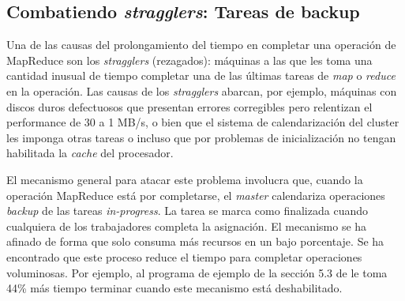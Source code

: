 \documentclass[spanish]{article}
\begin{document}
\subsection{Combatiendo \textit{stragglers}: Tareas de backup}
Una de las causas del prolongamiento del tiempo en completar una operación de MapReduce son los \textit{stragglers} (rezagados): máquinas a las que les toma una cantidad inusual de tiempo completar una de las últimas tareas de \textit{map} o \textit{reduce} en la operación. Las causas de los \textit{stragglers} abarcan, por ejemplo, m\'{a}quinas con discos duros defectuosos que presentan errores corregibles pero relentizan el performance de 30 a 1 MB/s, o bien que el sistema de calendarización del cluster les imponga otras tareas o incluso que por problemas de inicializaci\'{o}n no tengan habilitada la \textit{cache} del procesador. 

El mecanismo general para atacar este problema involucra que, cuando la operaci\'{o}n MapReduce est\'{a} por completarse, el \textit{master} calendariza operaciones \textit{backup} de las tareas \textit{in-progress}. La tarea se marca como finalizada cuando cualquiera de los trabajadores completa la asignaci\'{o}n. El mecanismo se ha afinado de forma que solo consuma m\'{a}s recursos en un bajo porcentaje. Se ha encontrado que este proceso reduce el tiempo para completar operaciones voluminosas. Por ejemplo, al programa de ejemplo de la secci\'{o}n 5.3 de \cite{MapReduceGoogle} le toma 44\% m\'{a}s tiempo terminar cuando este mecanismo est\'{a} deshabilitado.
\end{document}
